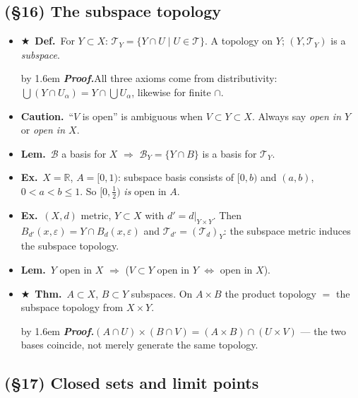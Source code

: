 \documentclass[12pt,a4paper]{article}
\newcommand{\Dfn}{\textbf{Def.}~}
\newcommand{\Thm}{\textbf{Thm.}~}
\newcommand{\Lem}{\textbf{Lem.}~}
\newcommand{\Exa}{\textbf{Ex.}~}
\newcommand{\Warn}{\textbf{Caution.}~}
\newcommand{\Key}{$\bigstar$~}                  %
\newcommand{\Pf}[1]{%
  \par\addvspace{7pt}\nopagebreak
  \begingroup
    \advance\leftskip by 1.6em
    \parindent=0pt \small\color{prf}%
    \textbf{\textit{Proof.}}\enspace #1\par
  \endgroup
  \addvspace{9pt}}
\newenvironment{BL}%
  {\begin{itemize}[leftmargin=1.4em,labelsep=0.55em,itemsep=11pt,topsep=11pt,parsep=0pt]}%
  {\end{itemize}}
\newcommand{\RR}{\mathbb{R}}
\newcommand{\cT}{\mathcal{T}}
\newcommand{\cB}{\mathcal{B}}
\renewcommand{\iff}{\Leftrightarrow}
\newcommand{\imp}{\Rightarrow}
\begin{document}
\subsection{(\S16) The subspace topology}

\begin{BL}
\item \Key\Dfn For $Y\subset X$: \; $\cT_Y=\{Y\cap U\mid U\in\cT\}$. A topology on $Y$;
      $(Y,\cT_Y)$ is a \emph{subspace}.
\Pf{All three axioms come from distributivity:
$\bigcup(Y\cap U_\alpha)=Y\cap\bigcup U_\alpha$, likewise for finite $\cap$.}
\item \Warn ``$V$ is open'' is ambiguous when $V\subset Y\subset X$. Always say
      \emph{open in $Y$} or \emph{open in $X$}.
\item \Lem $\cB$ a basis for $X$ $\imp$ $\cB_Y=\{Y\cap B\}$ is a basis for $\cT_Y$.
\item \Exa $X=\RR$, $A=[0,1)$: subspace basis consists of $[0,b)$ and $(a,b)$, $0<a<b\le1$.
      So $[0,\tfrac12)$ \emph{is} open in $A$.
\item \Exa $(X,d)$ metric, $Y\subset X$ with $d'=d|_{Y\times Y}$. Then
      $B_{d'}(x,\varepsilon)=Y\cap B_d(x,\varepsilon)$ and $\cT_{d'}=(\cT_d)_Y$:
      the subspace metric induces the subspace topology.
\item \Lem $Y$ open in $X$ $\imp$ ($V\subset Y$ open in $Y$ $\iff$ open in $X$).
\item \Key\Thm $A\subset X$, $B\subset Y$ subspaces. On $A\times B$ the product topology
      $=$ the subspace topology from $X\times Y$.
\Pf{$(A\cap U)\times(B\cap V)=(A\times B)\cap(U\times V)$ --- the two bases coincide, not merely
generate the same topology.}
\end{BL}

\subsection{(\S17) Closed sets and limit points}
\end{document}
